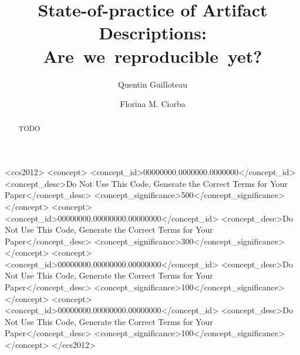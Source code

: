 \documentclass[sigconf]{acmart}
\newcommand{\ad}{Artifact Description}
\begin{document}
\title{State-of-practice of \ad s: Are~we~reproducible~yet?}

\author{Quentin Guilloteau}\author{Florina M. Ciorba}


\begin{abstract}
TODO
\end{abstract}

\begin{CCSXML}
<ccs2012>
 <concept>
  <concept_id>00000000.0000000.0000000</concept_id>
  <concept_desc>Do Not Use This Code, Generate the Correct Terms for Your Paper</concept_desc>
  <concept_significance>500</concept_significance>
 </concept>
 <concept>
  <concept_id>00000000.00000000.00000000</concept_id>
  <concept_desc>Do Not Use This Code, Generate the Correct Terms for Your Paper</concept_desc>
  <concept_significance>300</concept_significance>
 </concept>
 <concept>
  <concept_id>00000000.00000000.00000000</concept_id>
  <concept_desc>Do Not Use This Code, Generate the Correct Terms for Your Paper</concept_desc>
  <concept_significance>100</concept_significance>
 </concept>
 <concept>
  <concept_id>00000000.00000000.00000000</concept_id>
  <concept_desc>Do Not Use This Code, Generate the Correct Terms for Your Paper</concept_desc>
  <concept_significance>100</concept_significance>
 </concept>
</ccs2012>
\end{CCSXML}




\maketitle
\end{document}
